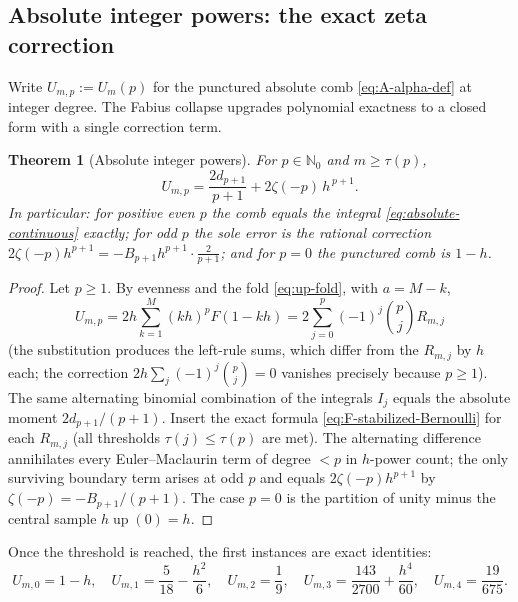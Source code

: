 \documentclass[11pt,oneside]{article}
\numberwithin{equation}{section}
\newtheorem{theorem}{Theorem}[section]
\theoremstyle{definition}
\theoremstyle{remark}
\newcommand{\N}{\mathbb N}
\newcommand{\Up}{\operatorname{up}}
\begin{document}
\subsection{Absolute integer powers: the exact zeta correction}

Write $U_{m,p}:=U_m(p)$ for the punctured absolute comb
\eqref{eq:A-alpha-def} at integer degree.  The Fabius collapse
upgrades polynomial exactness to a closed form with a single
correction term.

\begin{theorem}[Absolute integer powers]
\label{thm:absolute-integer}
For $p\in\N_0$ and $m\ge\tau(p)$,
\begin{equation}
 \boxed{\;
 U_{m,p}
 =\frac{2d_{p+1}}{p+1}
 +2\zeta(-p)\,h^{\,p+1}.
 \;}
 \label{eq:absolute-integer-closed}
\end{equation}
In particular: for positive even $p$ the comb equals the integral
\eqref{eq:absolute-continuous} \emph{exactly}; for odd $p$ the sole
error is the rational correction $2\zeta(-p)h^{p+1}
=-B_{p+1}h^{p+1}\cdot\frac{2}{p+1}$; and for $p=0$ the punctured comb
is $1-h$.
\end{theorem}

\begin{proof}
Let $p\ge1$.  By evenness and the fold \eqref{eq:up-fold}, with
$a=M-k$,
\[
 U_{m,p}
 =2h\sum_{k=1}^{M}(kh)^{p}F(1-kh)
 =2\sum_{j=0}^{p}(-1)^{j}\binom pj R_{m,j}
\]
(the substitution produces the left-rule sums, which differ from the
$R_{m,j}$ by $h$ each; the correction
$2h\sum_j(-1)^{j}\binom pj=0$ vanishes precisely because $p\ge1$).
The same alternating binomial combination of the integrals $I_j$
equals the absolute moment $2d_{p+1}/(p+1)$.  Insert the exact
formula \eqref{eq:F-stabilized-Bernoulli} for each $R_{m,j}$ (all
thresholds $\tau(j)\le\tau(p)$ are met).  The alternating difference
annihilates every Euler--Maclaurin term of degree $<p$ in $h$-power
count; the only surviving boundary term arises at odd $p$ and equals
$2\zeta(-p)h^{p+1}$ by $\zeta(-p)=-B_{p+1}/(p+1)$.  The case $p=0$ is
the partition of unity minus the central sample $h\Up(0)=h$.
\end{proof}

Once the threshold is reached, the first instances are exact
identities:
\begin{equation}
 U_{m,0}=1-h,\quad
 U_{m,1}=\frac5{18}-\frac{h^{2}}{6},\quad
 U_{m,2}=\frac19,\quad
 U_{m,3}=\frac{143}{2700}+\frac{h^{4}}{60},\quad
 U_{m,4}=\frac{19}{675}.
 \label{eq:U-low}
\end{equation}
\end{document}
